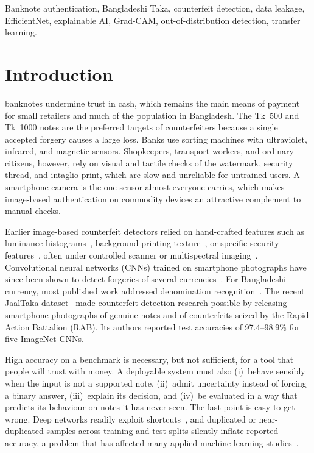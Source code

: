 \documentclass[journal]{IEEEtran}
\begin{document}
\begin{IEEEkeywords}
Banknote authentication, Bangladeshi Taka, counterfeit detection, data leakage,
EfficientNet, explainable AI, Grad-CAM, out-of-distribution detection, transfer learning.
\end{IEEEkeywords}

\section{Introduction}
\label{sec:intro}

 banknotes undermine trust in cash, which remains the main
means of payment for small retailers and much of the population in Bangladesh. The
Tk~500 and Tk~1000 notes are the preferred targets of counterfeiters because a single
accepted forgery causes a large loss. Banks use sorting machines with ultraviolet,
infrared, and magnetic sensors. Shopkeepers, transport workers, and ordinary citizens,
however, rely on visual and tactile checks of the watermark, security thread, and
intaglio print, which are slow and unreliable for untrained users. A smartphone camera is
the one sensor almost everyone carries, which makes image-based authentication on
commodity devices an attractive complement to manual checks.

Earlier image-based counterfeit detectors relied on hand-crafted features such as
luminance histograms~\cite{yeh2011}, background printing texture~\cite{berenguel2016}, or
specific security features~\cite{uddin2016}, often under controlled scanner or
multispectral imaging~\cite{baek2018}. Convolutional neural networks (CNNs) trained on
smartphone photographs have since been shown to detect forgeries of several
currencies~\cite{pham2020,pham2022}. For Bangladeshi currency, most published work
addressed denomination recognition~\cite{jahangir2007,linkon2020}. The recent JaalTaka
dataset~\cite{piyas2025jaaltaka} made counterfeit detection research possible by
releasing smartphone photographs of genuine notes and of counterfeits seized by the
Rapid Action Battalion (RAB). Its authors reported test accuracies of 97.4--98.9\% for
five ImageNet CNNs.

High accuracy on a benchmark is necessary, but not sufficient, for a tool that people
will trust with money. A deployable system must also (i)~behave sensibly when the input
is not a supported note, (ii)~admit uncertainty instead of forcing a binary answer,
(iii)~explain its decision, and (iv)~be evaluated in a way that predicts its behaviour on
notes it has never seen. The last point is easy to get wrong. Deep networks readily
exploit shortcuts~\cite{geirhos2020shortcut}, and duplicated or near-duplicated samples
across training and test splits silently inflate reported accuracy, a problem that has
affected many applied machine-learning studies~\cite{kapoor2023leakage}.
\end{document}
